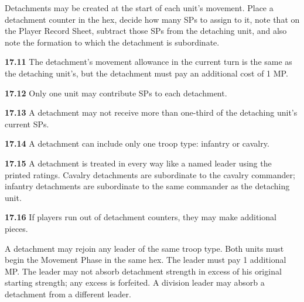 

Detachments may be created at the start of each unit's movement. Place a detachment counter in the hex, decide how many SPs to assign to it, note that on the Player Record Sheet, subtract those SPs from the detaching unit, and also note the formation to which the detachment is subordinate.

\textbf{17.11} The detachment's movement allowance in the current turn is the same as the detaching unit's, but the detachment must pay an additional cost of 1 MP.

\textbf{17.12} Only one unit may contribute SPs to each detachment.

\textbf{17.13} A detachment may not receive more than one-third of the detaching unit's current SPs.

\textbf{17.14} A detachment can include only one troop type: infantry or cavalry.

\textbf{17.15} A detachment is treated in every way like a named leader using the printed ratings. Cavalry detachments are subordinate to the cavalry commander; infantry detachments are subordinate to the same commander as the detaching unit.

\textbf{17.16} If players run out of detachment counters, they may make additional pieces.


A detachment may rejoin any leader of the same troop type. Both units must begin the Movement Phase in the same hex. The leader must pay 1 additional MP. The leader may not absorb detachment strength in excess of his original starting strength; any excess is forfeited. A division leader may absorb a detachment from a different leader.
